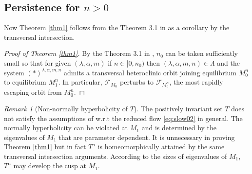 \documentclass[a4paper,11pt]{article}
\theoremstyle{remark}
\newtheorem{remark}{Remark}[section]
\begin{document}
\subsection{Persistence for $n>0$}
Now Theorem \ref{thm1} follows from the Theorem 3.1 in \cite{Sz1991} as a corollary by the transversal intersection.

\begin{proof}[Proof of Theorem \ref{thm1}]
 By the Theorem 3.1 in \cite{Sz1991}, $n_0$ can be taken sufficiently small so that for given $(\lambda,\alpha,m)$ if $n \in [0, n_0)$ then $(\lambda,\alpha,m,n) \in \Lambda$ and  the system $(*)^{\lambda,\alpha,m,n}$ admits a transversal heteroclinic orbit joining equilibrium $M_0^{n}$ to equilibrium $M_1^{n}$. In particular, $\mathcal{F}_{M_0}$ perturbs to $\mathcal{F}_{M_0^n}$, the most rapidly escaping orbit from $M_0^n$.
\end{proof}

\begin{remark}[Non-normally hyperbolicity of $T$]
The positively invariant set $T$ does not satisfy the assumptions of \cite[Theorem 4]{fenichel_persistence_1972} w.r.t the reduced flow \eqref{eq:slow02} in general. The normally hyperbolicity can be violated at $M_1$ and is determined by the eigenvalues of $M_1$ that are parameter dependent. It is unnecessary in proving Theorem \ref{thm1} but in fact $T^n$ is homeomorphically attained by the same transversal intersection arguments. According to the sizes of eigenvalues of $M_1$, $T^n$ may develop the cusp at $M_1$. %
%
%
\end{remark}


%
\end{document}
